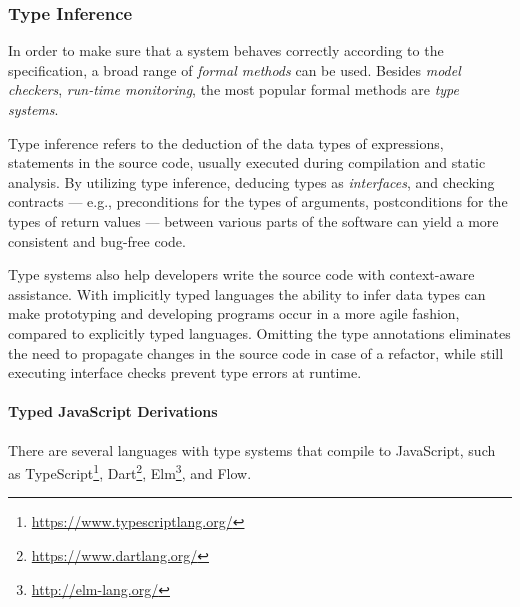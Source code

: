 \subsubsection{Type Inference}
\label{sect:introducing-type-inference}
In order to make sure that a system behaves correctly according to the specification, a broad range of \emph{formal methods} can be used. Besides \emph{model checkers}, \emph{run-time monitoring}, the most popular formal methods are \emph{type systems}.~\cite{pierce2002types} 

Type inference refers to the deduction of the data types of expressions, statements in the source code, usually executed during compilation and static analysis. By utilizing type inference, deducing types as \emph{interfaces}, and checking contracts --- e.g., preconditions for the types of arguments, postconditions for the types of return values --- between various parts of the software can yield a more consistent and bug-free code.

Type systems also help developers write the source code with context-aware assistance. With implicitly typed languages the ability to infer data types can make prototyping and developing programs occur in a more agile fashion, compared to explicitly typed languages. Omitting the type annotations eliminates the need to propagate changes in the source code in case of a refactor, while still executing interface checks prevent type errors at runtime.

\paragraph{Typed JavaScript Derivations} There are several languages with type systems that compile to JavaScript, such as TypeScript\footnote{\small\url{https://www.typescriptlang.org/}}, Dart\footnote{\small\url{https://www.dartlang.org/}}, Elm\footnote{\small\url{http://elm-lang.org/}}, and Flow.


